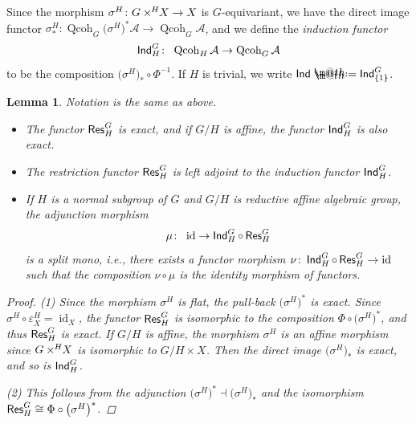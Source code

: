 \documentclass[pdftex]{sigma}%
\makeatletter
\newtheorem{lem}[dfn]{Lemma}
\newcommand*{\defeq}{\mathrel{\rlap{%
 \raisebox{0.3ex}{$\m@th\cdot$}}%
 \raisebox{-0.3ex}{$\m@th\cdot$}}%
 =}
\numberwithin{equation}{section}
\newcommand{\Qcoh}{\operatorname{Qcoh}}
\newcommand{\id}{\operatorname{id}}
\newcommand{\Res}{\operatorname{\sf Res}}
\newcommand{\Ind}{\operatorname{\sf Ind}}
\newcommand{\cA}{\mathcal{A}}
\newcommand{\timesH}{\times^{\hspace{-0.2mm}H\hspace{0.2mm}}\!\!}
\makeatother
\begin{document}
Since the morphism $\sigma^H\colon G\timesH X\to X$ is $G$-equivariant, we have the direct image functor $\sigma^H_*\colon\Qcoh_G\big(\sigma^{H}\big)^*\cA\to\Qcoh_G\cA$, and
we define the {\it induction functor}
\begin{gather*}
\Ind^G_H\colon\ \Qcoh_H \cA\to \Qcoh_G\cA
\end{gather*}
to be the composition $\big(\sigma^H\big)_*\circ \Phi^{-1}$. If $H$ is trivial, we write $\Ind\defeq\Ind^G_{\{1\}}$.
\begin{lem}\label{split mono} Notation is the same as above.
\begin{itemize}\itemsep=0pt
\item[$1.$] The functor $\Res^G_H$ is exact, and if $G/H$ is affine, the functor $\Ind^G_H$ is also exact.
\item[$2.$] The restriction functor $\Res^G_H$ is left adjoint to the induction functor $\Ind^G_H$.
\item[$3.$] If $H$ is a normal subgroup of $G$ and $G/H$ is reductive affine algebraic group, the adjunction morphism
\begin{gather*}
\mu\colon\ \id\to \Ind^G_H\circ \Res^G_H
\end{gather*}
is a split mono, i.e., there exists a functor morphism $\nu\colon\Ind^G_H\circ\Res^G_H\to \id$ such that the composition $\nu\circ\mu$ is the identity morphism of functors.

\end{itemize}
\begin{proof}
(1) Since the morphism $\sigma^H$ is flat, the pull-back $\big(\sigma^H\big)^*$ is exact. Since $\sigma^{H}\circ\varepsilon_X^H=\id_X$, the functor $\Res^G_H$ is isomorphic to the composition $\Phi\circ\big(\sigma^{H}\big)^*$, and thus $\Res^G_H$ is exact. If $G/H$ is affine, the morphism $\sigma^H$ is an affine morphism since $G\timesH X$ is isomorphic to $G/H\times X$. Then the direct image $\big(\sigma^{H}\big)_*$ is exact, and so is $\Ind^G_H$.

(2) This follows from the adjunction $\big(\sigma^{H}\big)^*\dashv\big(\sigma^{H}\big)_*$ and the isomorphism $\Res^G_H\cong \Phi\circ\big(\sigma^{H}\big)^*$.


\end{proof}
\end{lem}
\end{document}
